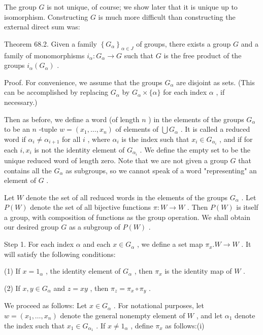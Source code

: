 \documentclass[10pt]{article}
\begin{document}
The group \(G\) is not unique, of course; we show later that it is unique up to isomorphism. Constructing \(G\) is much more difficult than constructing the external direct sum was:

Theorem 68.2. Given a family \({\left\{  {G}_{\alpha }\right\}  }_{\alpha  \in  J}\) of groups, there exists a group \(G\) and a family of monomorphisms \({i}_{\alpha } : {G}_{\alpha } \rightarrow  G\) such that \(G\) is the free product of the groups \({i}_{\alpha }\left( {G}_{\alpha }\right)\) .

Proof. For convenience, we assume that the groups \({G}_{\alpha }\) are disjoint as sets. (This can be accomplished by replacing \({G}_{\alpha }\) by \({G}_{\alpha } \times  \{ \alpha \}\) for each index \(\alpha\) , if necessary.)

Then as before, we define a word (of length \(n\) ) in the elements of the groups \({G}_{\alpha }\) to be an \(n\) -tuple \(w = \left( {{x}_{1},\ldots ,{x}_{n}}\right)\) of elements of \(\bigcup {G}_{\alpha }\) . It is called a reduced word if \({\alpha }_{i} \neq  {\alpha }_{i + 1}\) for all \(i\) , where \({\alpha }_{i}\) is the index such that \({x}_{i} \in  {G}_{{\alpha }_{i}}\) , and if for each \(i,{x}_{i}\) is not the identity element of \({G}_{{\alpha }_{i}}\) . We define the empty set to be the unique reduced word of length zero. Note that we are not given a group \(G\) that contains all the \({G}_{\alpha }\) as subgroups, so we cannot speak of a word "representing" an element of \(G\) .

Let \(W\) denote the set of all reduced words in the elements of the groups \({G}_{\alpha }\) . Let \(P\left( W\right)\) denote the set of all bijective functions \(\pi  : W \rightarrow  W\) . Then \(P\left( W\right)\) is itself a group, with composition of functions as the group operation. We shall obtain our desired group \(G\) as a subgroup of \(P\left( W\right)\) .

Step 1. For each index \(\alpha\) and each \(x \in  {G}_{\alpha }\) , we define a set map \({\pi }_{x}.W \rightarrow  W\) . It will satisfy the following conditions:

(1) If \(x = {1}_{\alpha }\) , the identity element of \({G}_{\alpha }\) , then \({\pi }_{x}\) is the identity map of \(W\) .

(2) If \(x,y \in  {G}_{\alpha }\) and \(z = {xy}\) , then \({\pi }_{z} = {\pi }_{x} \circ  {\pi }_{y}\) .

We proceed as follows: Let \(x \in  {G}_{\alpha }\) . For notational purposes, let \(w = \left( {{x}_{1},\ldots ,{x}_{n}}\right)\) denote the general nonempty element of \(W\) , and let \({\alpha }_{1}\) denote the index such that \({x}_{1} \in  {G}_{{\alpha }_{1}}\) . If \(x \neq  {1}_{\alpha }\) , define \({\pi }_{x}\) as follows:(i)
\end{document}

